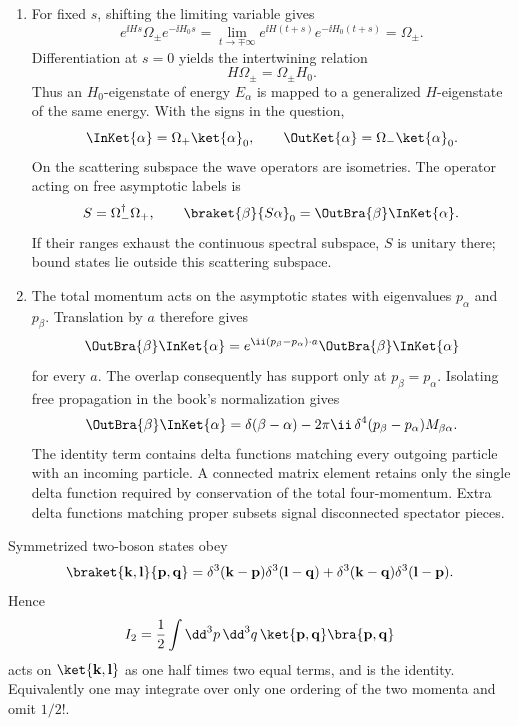 
\begin{enumerate}
\begin{enumerate}
\item
For fixed \(s\), shifting the limiting variable gives
\[
 e^{\ii Hs}\Omega_\pm e^{-\ii H_0s}
 =\lim_{t\to\mp\infty}e^{\ii H(t+s)}e^{-\ii H_0(t+s)}
 =\Omega_\pm .
\]
Differentiation at \(s=0\) yields the intertwining relation
\[
 H\Omega_\pm=\Omega_\pm H_0.
\]
Thus an \(H_0\)-eigenstate of energy \(E_\alpha\) is mapped to a
generalized \(H\)-eigenstate of the same energy.  With the signs in the
question,
\[
 \InKet{\alpha}=\Omega_+\ket{\alpha}_0,\qquad
 \OutKet{\alpha}=\Omega_-\ket{\alpha}_0.
\]
On the scattering subspace the wave operators are isometries.  The
operator acting on free asymptotic labels is
\[
 S=\Omega_-^\dagger\Omega_+,\qquad
 \braket{\beta}{S\alpha}_0=\OutBra{\beta}\InKet{\alpha}.
\]
If their ranges exhaust the continuous spectral subspace, \(S\) is
unitary there; bound states lie outside this scattering subspace.
\item
The total momentum acts on the asymptotic states with eigenvalues
\(p_\alpha\) and \(p_\beta\).  Translation by \(a\) therefore gives
\[
 \OutBra{\beta}\InKet{\alpha}
 =e^{\ii(p_\beta-p_\alpha)\cdot a}
 \OutBra{\beta}\InKet{\alpha}
\]
for every \(a\).  The overlap consequently has support only at
\(p_\beta=p_\alpha\).  Isolating free propagation in the book's
normalization gives
\[
 \OutBra{\beta}\InKet{\alpha}
 =\delta(\beta-\alpha)
 -2\pi \ii\,\delta^4(p_\beta-p_\alpha)M_{\beta\alpha}.
\]
The identity term contains delta functions matching every outgoing
particle with an incoming particle.  A connected matrix element retains
only the single delta function required by conservation of the total
four-momentum.  Extra delta functions matching proper subsets signal
disconnected spectator pieces.
\end{enumerate}

Symmetrized two-boson states obey
\[
 \braket{\mathbf k,\mathbf l}{\mathbf p,\mathbf q}
 =\delta^3(\mathbf k-\mathbf p)\delta^3(\mathbf l-\mathbf q)
 +\delta^3(\mathbf k-\mathbf q)\delta^3(\mathbf l-\mathbf p).
\]
Hence
\[
 I_2=\frac12\int \dd^3p\,\dd^3q\,
 \ket{\mathbf p,\mathbf q}\bra{\mathbf p,\mathbf q}
\]
acts on \(\ket{\mathbf k,\mathbf l}\) as one half times two equal terms,
and is the identity.  Equivalently one may integrate over only one
ordering of the two momenta and omit \(1/2!\).


\end{enumerate}
